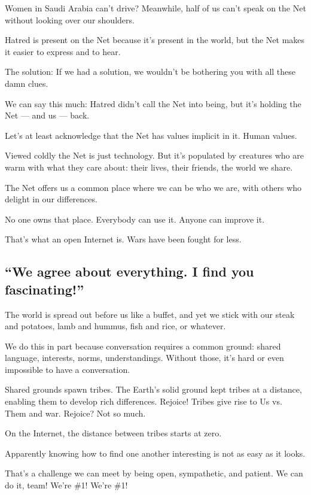 \documentclass[letterpaper,12pt,english]{sphinxmanual}
\begin{document}
Women in Saudi Arabia can't drive? Meanwhile, half of us can't speak on the Net without looking over our shoulders.

Hatred is present on the Net because it's present in the world, but the Net makes it easier to express and to hear.

The solution: If we had a solution, we wouldn't be bothering you with all these damn clues.

We can say this much: Hatred didn't call the Net into being, but it's holding the Net — and us — back.

Let's at least acknowledge that the Net has values implicit in it. Human values.

Viewed coldly the Net is just technology. But it's populated by creatures who are warm with what they care about: their lives, their friends, the world we share.

The Net offers us a common place where we can be who we are, with others who delight in our differences.

No one owns that place. Everybody can use it. Anyone can improve it.

That's what an open Internet is. Wars have been fought for less.


\subsection{``We agree about everything. I find you fascinating!''}
\label{2015newclues:we-agree-about-everything-i-find-you-fascinating}
The world is spread out before us like a buffet, and yet we stick with our steak and potatoes, lamb and hummus, fish and rice, or whatever.

We do this in part because conversation requires a common ground: shared language, interests, norms, understandings. Without those, it's hard or even impossible to have a conversation.

Shared grounds spawn tribes. The Earth's solid ground kept tribes at a distance, enabling them to develop rich differences. Rejoice! Tribes give rise to Us vs. Them and war. Rejoice? Not so much.

On the Internet, the distance between tribes starts at zero.

Apparently knowing how to find one another interesting is not as easy as it looks.

That's a challenge we can meet by being open, sympathetic, and patient. We can do it, team! We're \#1! We're \#1!
\end{document}

